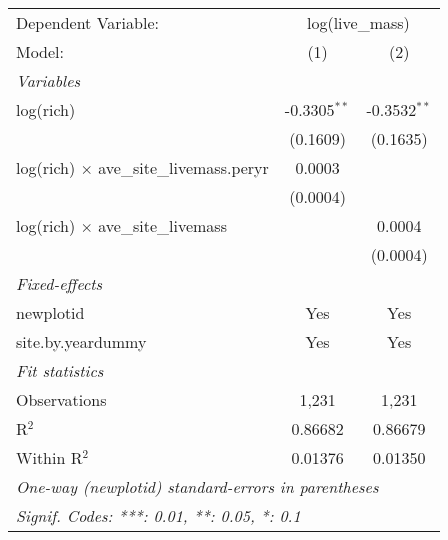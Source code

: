 \begin{tabular}{lcc}
\tabularnewline\midrule\midrule
Dependent Variable:&\multicolumn{2}{c}{log(live\_mass)}\\
Model:&(1) & (2)\\
\midrule \emph{Variables}&   &  \\
log(rich)&-0.3305$^{**}$ & -0.3532$^{**}$\\
  &(0.1609) & (0.1635)\\
log(rich) $\times $ ave\_site\_livemass.peryr&0.0003 &   \\
  &(0.0004) &   \\
log(rich) $\times $ ave\_site\_livemass&   & 0.0004\\
  &   & (0.0004)\\
\midrule \emph{Fixed-effects}&   &  \\
newplotid & Yes & Yes\\
site.by.yeardummy & Yes & Yes\\
\midrule \emph{Fit statistics}&  & \\
Observations & 1,231&1,231\\
R$^2$ & 0.86682&0.86679\\
Within R$^2$ & 0.01376&0.01350\\
\midrule\midrule\multicolumn{3}{l}{\emph{One-way (newplotid) standard-errors in parentheses}}\\
\multicolumn{3}{l}{\emph{Signif. Codes: ***: 0.01, **: 0.05, *: 0.1}}\\
\end{tabular}


